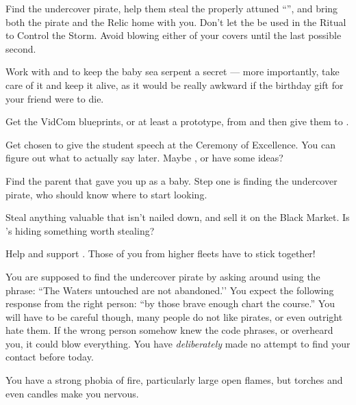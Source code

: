 \documentclass[char]{GL2020}
\begin{document}
\begin{itemz}
    \item Find the undercover pirate, help them steal the properly attuned ``\iNet{}'', and bring both the pirate and the Relic home with you. Don't let the \iNet{} be used in the Ritual to Control the Storm. Avoid blowing either of your covers until the last possible second.
    \item Work with \cDisney{} and \cAdopted{} to keep the baby sea serpent a secret — more importantly, take care of it and keep it alive, as it would be really awkward if the birthday gift for your friend were to die.
    \item Get the VidCom blueprints, or at least a prototype, from \cTechStar{} and then give them to \cChupLeader{}.
\end{itemz}

\begin{itemz}
    \item Get chosen to give the student speech at the Ceremony of Excellence. You can figure out what to actually say later. Maybe \cJuniorStatesman{}, \cChupAvenger{} or \cPirate{} have some ideas?
    \item Find the parent that gave you up as a baby. Step one is finding the undercover pirate, who should know where to start looking.
    \item Steal anything valuable that isn’t nailed down, and sell it on the Black Market. Is \cChupInventor{}’s hiding something worth stealing?
    \item Help and support \cWarlordDaughter{}. Those of you from higher fleets have to stick together!
\end{itemz}

\begin{itemz}[Notes]
    \item You are supposed to find the undercover pirate by asking around using the phrase: ``The Waters untouched are not abandoned.'’ You expect the following response from the right person: ``by those brave enough chart the course.'' You will have to be careful though, many people do not like pirates, or even outright hate them. If the wrong person somehow knew the code phrases, or overheard you, it could blow everything. You have \emph{deliberately} made no attempt to find your contact before today.
    \item You have a strong phobia of fire, particularly large open flames, but torches and even candles make you nervous.
\end{itemz}
\end{document}
